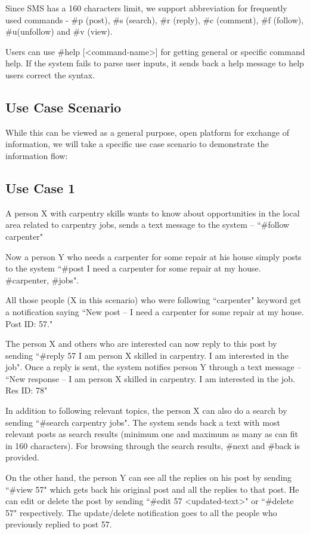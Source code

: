 \documentclass{chi-ext}
\begin{document}
Since SMS has a 160 characters limit, we support abbreviation for frequently used commands - \#p (post), \#s (search), \#r (reply), \#c (comment), \#f (follow), \#u(unfollow) and \#v (view). 

Users can use \#help [\textless command-name\textgreater] for getting general or specific command help. If the system fails to parse user inputs, it sends back a help message to help users correct the syntax.


\subsection{Use Case Scenario}
While this can be viewed as a general purpose, open platform for exchange of information, we will take a specific use case scenario to demonstrate the information flow:

\subsection{Use Case 1}
A person X  with carpentry skills wants to know about opportunities in the local area related to carpentry jobs, sends a text message to the system -- ``\#follow carpenter"

Now a person Y who needs a carpenter for some repair at his house simply posts to the system ``\#post I need a carpenter for some repair at my house. \#carpenter, \#jobs".

All those people (X in this scenario) who were following ``carpenter" keyword get a notification saying ``New post -- I need a carpenter for some repair at my house. Post ID: 57."

The person X and others who are interested can now reply to this post by sending ``\#reply 57 I am person X skilled in carpentry. I am interested in the job". Once a reply is sent, the system notifies person Y through a text message -- ``New response -- I am person X skilled in carpentry. I am interested in the job. Res ID: 78"

In addition to following relevant topics, the person X can also do a search by sending ``\#search carpentry jobs". The system sends back a text with most relevant posts as search results (minimum one and maximum as many as can fit in 160 characters). For browsing through the search results, \#next and \#back is provided.

On the other hand, the person Y can see all the replies on his post by sending ``\#view 57" which gets back his original post and all the replies to that post. He can edit or delete the post by sending ``\#edit 57 \textless updated-text\textgreater"  or ``\#delete 57" respectively. The update/delete notification goes to all the people who previously replied to post 57.
\end{document}
